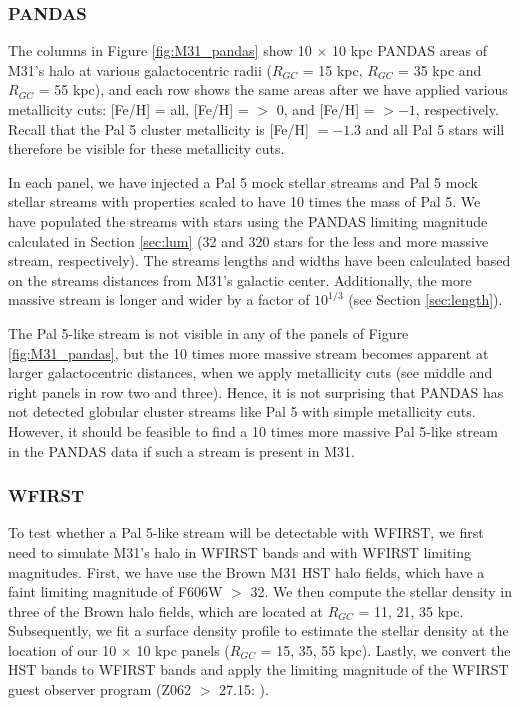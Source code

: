 \documentclass[twocolumn]{aastex62}
\begin{document}
\subsubsection{PANDAS}
\label{sec:PANDAS}
The columns in Figure \ref{fig:M31_pandas} show 10 $\times$ 10 kpc PANDAS areas of M31's halo at various galactocentric radii ($R_{GC}$ = 15  kpc, $R_{GC}$ = 35 kpc and $R_{GC}$ = 55 kpc), and each row shows the same areas after we have applied various metallicity cuts: [Fe/H] = all,  [Fe/H] = $>$ 0, and  [Fe/H] = $> -1 $, respectively. Recall that the Pal 5 cluster metallicity is  [Fe/H] $= -1.3$ and all Pal 5 stars will therefore be visible for these metallicity cuts. 

In each panel, we have injected a Pal 5 mock stellar streams and Pal 5 mock stellar streams with properties scaled to have 10 times the mass of Pal 5. We have populated the streams with stars using the PANDAS limiting magnitude calculated in Section \ref{sec:lum} (32 and 320 stars for the less and more massive stream, respectively).  The streams lengths and widths have been calculated based on the streams distances from M31's galactic center. Additionally, the more massive stream is longer and wider by a factor of $10^{1/3}$ (see Section \ref{sec:length}). 

The Pal 5-like stream is not visible in any of the panels of Figure \ref{fig:M31_pandas}, but the 10 times more massive stream becomes apparent at larger galactocentric distances, when we apply metallicity cuts (see middle and right panels in row two and three). Hence, it is not surprising that PANDAS has not detected globular cluster streams like Pal 5 with simple metallicity cuts. However, it should be feasible to find a 10 times more massive Pal 5-like stream in the PANDAS data if such a stream is present in M31. 

\subsubsection{WFIRST}
\label{sec:WFIRST}
To test whether a Pal 5-like stream will be detectable with WFIRST, we first need to simulate M31's halo in WFIRST bands and with WFIRST limiting magnitudes. First, we have use the Brown M31 HST halo fields, which have a faint limiting magnitude of F606W $>$ 32. We then compute the stellar density in three of the Brown halo fields, which are located at $R_{GC}$ = 11, 21, 35 kpc. Subsequently, we fit a surface density profile to estimate the stellar density at the location of our 10 $\times$ 10 kpc panels ($R_{GC}$ = 15, 35, 55 kpc). Lastly, we convert the HST bands to WFIRST bands and apply the limiting magnitude of the WFIRST guest observer program (Z062 $>$ 27.15: \citealt{spergel13}). 
\end{document}
